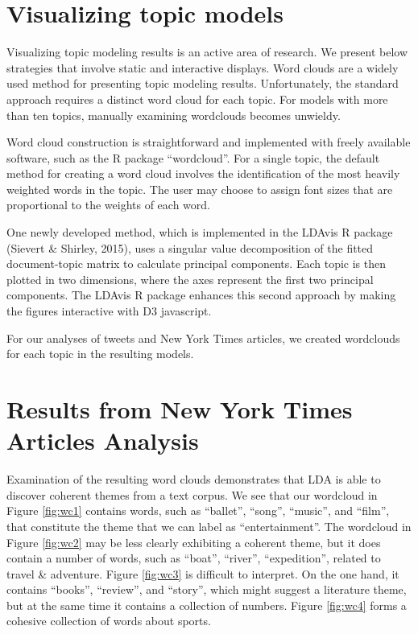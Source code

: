 \documentclass[12pt,]{article}
\begin{document}
\section{Visualizing topic models}\label{visualizing-topic-models}

Visualizing topic modeling results is an active area of research. We
present below strategies that involve static and interactive displays.
Word clouds are a widely used method for presenting topic modeling
results. Unfortunately, the standard approach requires a distinct word
cloud for each topic. For models with more than ten topics, manually
examining wordclouds becomes unwieldy.

Word cloud construction is straightforward and implemented with freely
available software, such as the R package ``wordcloud''. For a single
topic, the default method for creating a word cloud involves the
identification of the most heavily weighted words in the topic. The user
may choose to assign font sizes that are proportional to the weights of
each word.

One newly developed method, which is implemented in the LDAvis R package
(Sievert \& Shirley, 2015), uses a singular value decomposition of the
fitted document-topic matrix to calculate principal components. Each
topic is then plotted in two dimensions, where the axes represent the
first two principal components. The LDAvis R package enhances this
second approach by making the figures interactive with D3 javascript.

For our analyses of tweets and New York Times articles, we created
wordclouds for each topic in the resulting models.

\section{Results from New York Times Articles
Analysis}\label{results-from-new-york-times-articles-analysis}

Examination of the resulting word clouds demonstrates that LDA is able
to discover coherent themes from a text corpus. We see that our
wordcloud in Figure \ref{fig:wc1} contains words, such as ``ballet'',
``song'', ``music'', and ``film'', that constitute the theme that we can
label as ``entertainment''. The wordcloud in Figure \ref{fig:wc2} may be
less clearly exhibiting a coherent theme, but it does contain a number
of words, such as ``boat'', ``river'', ``expedition'', related to travel
\& adventure. Figure \ref{fig:wc3} is difficult to interpret. On the one
hand, it contains ``books'', ``review'', and ``story'', which might
suggest a literature theme, but at the same time it contains a
collection of numbers. Figure \ref{fig:wc4} forms a cohesive collection
of words about sports.
\end{document}
